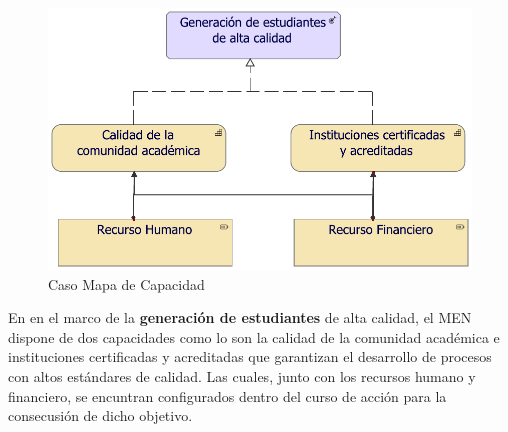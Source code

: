 \begin{figure}[h!]
	\centering
	\includegraphics[width=.8\linewidth]{imgs/modelo/estrategia/capacidad/2.pdf}
	\caption{Caso Mapa de Capacidad}
\end{figure}

En en el marco de la \textbf{generación de estudiantes} de alta calidad, el MEN dispone de dos capacidades como lo son la calidad de la comunidad académica e instituciones certificadas y acreditadas que garantizan el desarrollo de procesos con altos estándares de calidad. Las cuales, junto con los recursos humano y financiero, se encuntran configurados dentro del curso de acción para la consecusión de dicho objetivo.